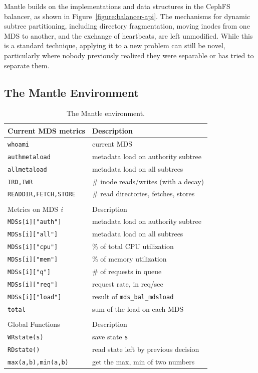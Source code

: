 Mantle builds on the implementations and data structures in the CephFS balancer, as shown in Figure~\ref{figure:balancer-api}. The mechanisms for dynamic subtree partitioning, including directory fragmentation, moving inodes from one MDS to another, and the exchange of heartbeats, are left unmodified. While this is a standard technique, applying it to a new problem can still be novel, particularly where nobody previously realized they were separable or has tried to separate them.

\subsection{The Mantle Environment}
\label{the-mantle-environment}
\begin{table}[tb]
	\centering
	\ssp
	\begin{tabular}{ >{}p{4cm} | >{}p{10cm}}
    	\centering Current MDS metrics
		& \centering Description
		\tabularnewline\hline	
		\small\texttt{whoami}
		& current MDS 
		\tabularnewline
		\small\texttt{authmetaload}
		& metadata load on authority subtree
		\tabularnewline	        
		\small\texttt{allmetaload}
		& metadata load on all subtrees
		\tabularnewline	     
		\small\texttt{IRD,IWR}
		& \# inode reads/writes (with a decay)
		\tabularnewline
		\small\texttt{READDIR,FETCH,STORE}
		& \# read directories, fetches, stores
		\tabularnewline	                
        \multicolumn{2}{c}{}
        \tabularnewline
       
		\centering Metrics on MDS {\it i}
		& \centering Description
		\tabularnewline\hline       
		\small\texttt{MDSs[i]["auth"]}	
		& metadata load on authority subtree
		\tabularnewline			
		\small\texttt{MDSs[i]["all"]}	
		& metadata load on all subtrees
		\tabularnewline	        
		\small\texttt{MDSs[i]["cpu"]}
		& \% of total CPU utilization
		\tabularnewline	
		\small\texttt{MDSs[i]["mem"]}	
		& \% of memory utilization
		\tabularnewline	
		\small\texttt{MDSs[i]["q"]}	
		& \# of requests in queue
		\tabularnewline
		\small\texttt{MDSs[i]["req"]}	
		& request rate, in req/sec
		\tabularnewline				
		\small\texttt{MDSs[i]["load"]}	
		& result of \texttt{mds\_bal\_mdsload}
        \tabularnewline
		\small\texttt{total}
		& sum of the load on each MDS        
        \tabularnewline
        \multicolumn{2}{c}{}
        \tabularnewline
        
		\centering Global Functions
		& \centering Description
		\tabularnewline\hline	 
		\small\texttt{WRstate(s)}
		& save state \texttt{s}
        \tabularnewline
        \small\texttt{RDstate()}	
		& read state left by previous decision
        \tabularnewline
        \small\texttt{max(a,b),min(a,b)}
        & get the max, min of two numbers
	\end{tabular}
	\dsp
	\caption{The Mantle environment.\label{table:metrics}}    
\end{table}

